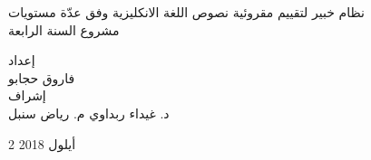 	
	\vspace{2cm}
	\begin{center}
		{
			\Huge


			نظام خبير لتقييم مقروئية نصوص اللغة الانكليزية وفق عدّة مستويات
			\\[2.5mm]
			\Large
			مشروع السنة الرابعة
		}
	
		\vspace{3cm}
		\begin{doublespace}
			إعداد \\
			{
				\authorsfont
				فاروق حجابو \\[7mm]
			}
			إشراف \\[3mm]
			{
				\authorsfont
				د. غيداء ربداوي
				\hspace{2.5cm}
				م. رياض سنبل
			}
		\end{doublespace}
	\end{center}
		
	\vfill
	\centerline{2 أيلول 2018}
	


